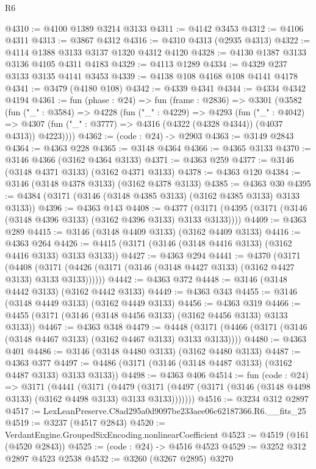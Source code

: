 \begin{lexlean}{R6}
\begin{coremodule}
@4310 := @4100 @1389 @3214 @3133
@4311 := @4142 @3453
@4312 := @4106 @4311
@4313 := @3867 @4312
@4316 := @4310 @4313 (@2935 @4313)
@4322 := @4114 @1388 @3133 @3137 @1320 @4312 @4120
@4328 := @4130 @1387 @3133 @3136 @4105 @4311 @4183
@4329 := @4113 @1289
@4334 := @4329 @237 @3133 @3135 @4141 @3453
@4339 := @4138 @108 @4168 @108 @4141 @4178
@4341 := @3479 (@4180 @108)
@4342 := @4339 @4341
@4344 := @4334 @4342 @4194
@4361 := fun (phase : @24) =>
  fun (frame : @2836) =>
  @3301
    (@3582
      (fun ("_" : @3584) =>
      @4228
        (fun ("_" : @4229) =>
        @4293
          (fun ("_" : @4042) =>
          @4307 (fun ("_" : @3777) => @4316 (@4322 (@4328 @4344)) (@4037 @4313)) @4223))))
@4362 := (code : @24) -> @2903
@4363 := @3149 @2843
@4364 := @4363 @228
@4365 := @3148 @4364
@4366 := @4365 @3133
@4370 := @3146 @4366 (@3162 @4364 @3133)
@4371 := @4363 @259
@4377 := @3146 (@3148 @4371 @3133) (@3162 @4371 @3133)
@4378 := @4363 @120
@4384 := @3146 (@3148 @4378 @3133) (@3162 @4378 @3133)
@4385 := @4363 @30
@4395 := @4384 (@3171 (@3146 (@3148 @4385 @3133) (@3162 @4385 @3133) @3133 @3133))
@4396 := @4363 @143
@4408 := @4377 (@3171 (@4395 (@3171 (@3146 (@3148 @4396 @3133) (@3162 @4396 @3133) @3133 @3133))))
@4409 := @4363 @289
@4415 := @3146 (@3148 @4409 @3133) (@3162 @4409 @3133)
@4416 := @4363 @264
@4426 := @4415 (@3171 (@3146 (@3148 @4416 @3133) (@3162 @4416 @3133) @3133 @3133))
@4427 := @4363 @294
@4441 := @4370
    (@3171
      (@4408 (@3171 (@4426 (@3171 (@3146 (@3148 @4427 @3133) (@3162 @4427 @3133) @3133 @3133))))))
@4442 := @4363 @372
@4448 := @3146 (@3148 @4442 @3133) (@3162 @4442 @3133)
@4449 := @4363 @343
@4455 := @3146 (@3148 @4449 @3133) (@3162 @4449 @3133)
@4456 := @4363 @319
@4466 := @4455 (@3171 (@3146 (@3148 @4456 @3133) (@3162 @4456 @3133) @3133 @3133))
@4467 := @4363 @348
@4479 := @4448 (@3171 (@4466 (@3171 (@3146 (@3148 @4467 @3133) (@3162 @4467 @3133) @3133 @3133))))
@4480 := @4363 @401
@4486 := @3146 (@3148 @4480 @3133) (@3162 @4480 @3133)
@4487 := @4363 @377
@4497 := @4486 (@3171 (@3146 (@3148 @4487 @3133) (@3162 @4487 @3133) @3133 @3133))
@4498 := @4363 @406
@4514 := fun (code : @24) =>
  @3171
    (@4441
      (@3171
        (@4479
          (@3171 (@4497 (@3171 (@3146 (@3148 @4498 @3133) (@3162 @4498 @3133) @3133 @3133)))))))
@4516 := @3234 @312 @2897
@4517 := LexLeanPreserve.C8ad295a0d9097be233aee06c62187366.R6.__fits_25
@4519 := @3237 (@4517 @2843)
@4520 := VerdantEngine.GroupedSixEncoding.nonlinearCoefficient
@4523 := @4519 (@161 (@4520 @2843))
@4525 := (code : @24) -> @4516 @4523
@4529 := @3252 @312 @2897 @4523 @2538
@4532 := @3260 (@3267 @2895) @3270

\end{coremodule}
\end{lexlean}
